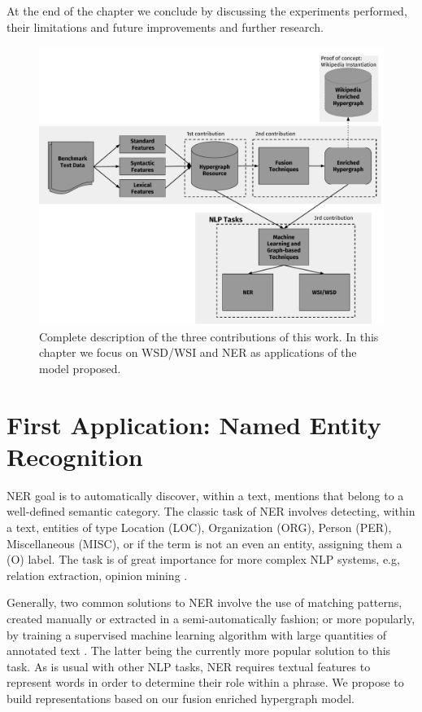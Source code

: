 At the end of the chapter we conclude by discussing the experiments performed, their limitations and  future improvements and further research. 

\begin{figure}
\centering
\includegraphics[width=.7\linewidth]{images/Chapitre4/main_diag2.pdf}
\caption{Complete description of the three contributions of this work. In this chapter we focus on  WSD/WSI and NER as applications of the model proposed.}
\label{fig:main_diag2}
\end{figure}

\section{First Application: Named Entity Recognition}
\label{sec:ner}


 NER goal is to automatically discover, within a text, mentions that belong to a well-defined semantic category. The classic task of NER involves detecting, within a text, entities of type Location (LOC), Organization (ORG), Person (PER), Miscellaneous (MISC), or if the term is not an even an entity, assigning them a (O) label. The task is of great importance for more complex NLP systems, e.g, relation extraction, opinion mining \cite{nadeau2007survey}.  
 
 Generally, two common solutions to NER involve the use of matching patterns, created manually or extracted in a semi-automatically fashion\cite{gupta2015distantly}; or more popularly, by training a supervised machine learning algorithm with large quantities of annotated text \cite{mining12Book}. The latter being the currently more popular solution to this task. As is usual with other NLP tasks, NER  requires textual features to represent words in order to determine their role within a phrase. We propose to build representations based on our fusion enriched hypergraph model.



